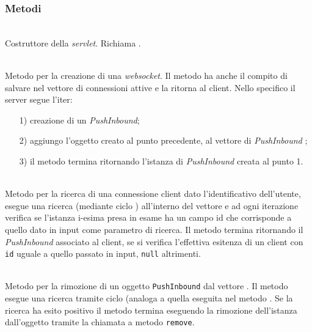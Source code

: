 \subsubsection*{Metodi}
\begin{description}
	\item{}\\
	Costruttore della \textit{servlet}. Richiama .
	
	\item{}\\
	Metodo per la creazione di una \textit{websocket}. Il metodo ha anche il compito di salvare nel vettore di connessioni attive e la ritorna al client. Nello specifico il server segue l'iter:
	
	\begin{itemize}
		\item[1)] creazione di un \textit{PushInbound};
		\item[2)] aggiungo l'oggetto creato al punto precedente, al vettore di \textit{PushInbound} ;
		\item[3)] il metodo termina ritornando l'istanza di \textit{PushInbound} creata al punto 1.
	\end{itemize}
	
	\item{}\\
	Metodo per la ricerca di una connessione client dato l'identificativo dell'utente, esegue una ricerca (mediante ciclo ) all'interno del vettore  e ad ogni iterazione verifica se l'istanza i-esima presa in esame ha un campo id che corrisponde a quello dato in input come parametro di ricerca.
Il metodo termina ritornando il \textit{PushInbound} associato al client, se si verifica l'effettiva esitenza di un client con \texttt{id} uguale a quello passato in input, \texttt{null} altrimenti.
	
	\item{}\\
	Metodo per la rimozione di un oggetto \texttt{PushInbound} dal vettore . Il metodo esegue una ricerca tramite ciclo  (analoga a quella eseguita nel metodo . Se la ricerca ha esito positivo il metodo termina eseguendo la rimozione dell'istanza dall'oggetto  tramite la chiamata a metodo \texttt{remove}.
\end{description}

